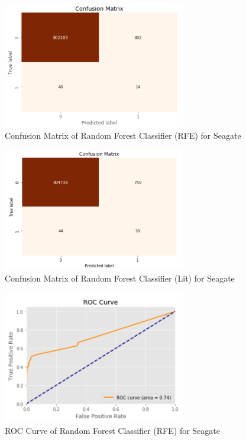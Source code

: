 \documentclass[conference]{IEEEtran}
\begin{document}
\begin{itemize}
        
        \begin{figure}[htp]
        \centering
        \includegraphics[width=8cm]{Asanga/sgt_cm_rfe.PNG}
        \caption{Confusion Matrix of Random Forest Classifier (RFE) for Seagate}
    \end{figure}
    
        \begin{figure}[htp]
        \centering
        \includegraphics[width=8cm]{Asanga/sgt_cm_lit.PNG}
        \caption{Confusion Matrix of Random Forest Classifier (Lit) for Seagate}
    \end{figure}
    
            \begin{figure}[htp]
        \centering
        \includegraphics[width=8cm]{Asanga/sgt_roc_rfe.PNG}
        \caption{ROC Curve of Random Forest Classifier (RFE) for Seagate}
    \end{figure}
    

\end{itemize}
\end{document}
